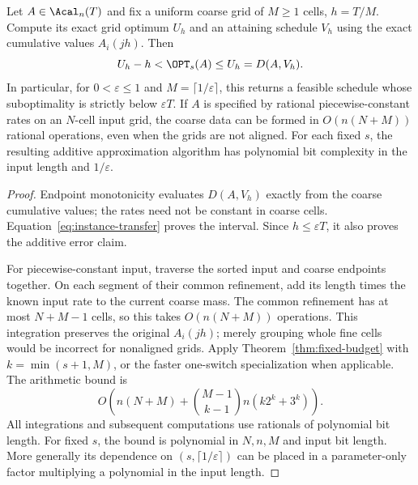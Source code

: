 \begin{theorem}\label{thm:certified-coarsening}
Let $A\in\Acal_n(T)$ and fix a uniform coarse grid of $M\ge1$ cells,
$h=T/M$. Compute its exact grid optimum $U_h$ and an attaining schedule
$V_h$ using the exact cumulative values $A_i(jh)$. Then
\begin{equation}\label{eq:coarsening-certificate}
 U_h-h<\OPT_s(A)\le U_h=D(A,V_h).
\end{equation}
In particular, for $0<\varepsilon\le1$ and $M=\lceil1/\varepsilon\rceil$,
this returns a feasible schedule whose suboptimality is strictly below
$\varepsilon T$. If $A$ is specified by rational piecewise-constant rates
on an $N$-cell input grid, the coarse data can be formed in
$O(n(N+M))$ rational operations, even when the grids are not aligned.
For each fixed $s$, the resulting additive approximation algorithm has
polynomial bit complexity in the input length and $1/\varepsilon$.
\end{theorem}
\begin{proof}
Endpoint monotonicity evaluates $D(A,V_h)$ exactly from the coarse cumulative
values; the rates need not be constant in coarse cells.
Equation~\eqref{eq:instance-transfer} proves the interval. Since
$h\le\varepsilon T$, it also proves the additive error claim.

For piecewise-constant input, traverse the sorted input and coarse endpoints
together. On each segment of their common refinement, add its length times
the known input rate to the current coarse mass. The common refinement has
at most $N+M-1$ cells, so this takes $O(n(N+M))$ operations. This integration
preserves the original $A_i(jh)$; merely grouping whole fine cells would be
incorrect for nonaligned grids. Apply Theorem~\ref{thm:fixed-budget} with
$k=\min(s+1,M)$, or the faster one-switch specialization when applicable.
The arithmetic bound is
\begin{equation}\label{eq:coarsening-complexity}
 O\left(n(N+M)+\binom{M-1}{k-1}n(k2^k+3^k)\right).
\end{equation}
All integrations and subsequent computations use rationals of polynomial
bit length. For fixed $s$, the bound is polynomial in $N,n,M$ and input
bit length. More generally its dependence on $(s,\lceil1/\varepsilon\rceil)$
can be placed in a parameter-only factor multiplying a polynomial in the
input length.
\end{proof}

